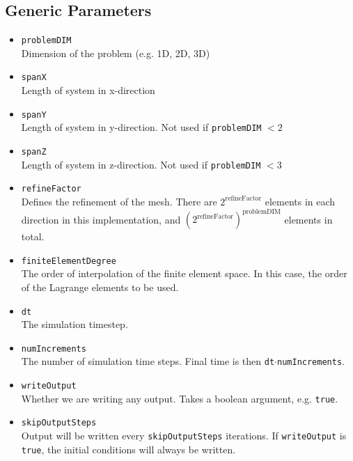 \documentclass[11pt]{article}
\begin{document}
\subsection{Generic Parameters}
\begin{itemize}
\item \texttt{problemDIM} \\
	Dimension of the problem (e.g. 1D, 2D, 3D)
\item \texttt{spanX} \\
	Length of system in x-direction
\item \texttt{spanY} \\
	Length of system in y-direction.  Not used if \texttt{problemDIM} $< 2$
\item \texttt{spanZ} \\
	Length of system in z-direction.  Not used if \texttt{problemDIM} $< 3$
\item \texttt{refineFactor} \\
	Defines the refinement of the mesh.  There are $2^{\mathrm{refineFactor}}$ elements in each direction in this implementation, and 						$\left( 2^{\mathrm{refineFactor}} \right)^{\mathrm{problemDIM}}$ elements in total.
\item \texttt{finiteElementDegree} \\
	The order of interpolation of the finite element space.  In this case, the order of the Lagrange elements to be used.
\item \texttt{dt} \\
	The simulation timestep.
\item \texttt{numIncrements} \\
	The number of simulation time steps.  Final time is then \texttt{dt}$\cdot$\texttt{numIncrements}.
\item \texttt{writeOutput} \\
	Whether we are writing any output.  Takes a boolean argument, e.g. \texttt{true}.
\item \texttt{skipOutputSteps} \\
	Output will be written every \texttt{skipOutputSteps} iterations.  If \texttt{writeOutput} is \texttt{true}, the initial conditions will always be written.
\end{itemize}

\end{document}
